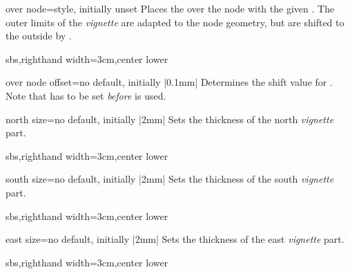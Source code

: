 \begin{vigTcbKey}[][doc new=2016-04-22]{over node}{=}{style, initially unset}
  Places the  over the node with the given .
  The outer limits of the \emph{vignette} are adapted to the node geometry, but
  are shifted to the outside by .
\begin{dispExample*}{sbs,righthand width=3cm,center lower}
\end{dispExample*}
\end{vigTcbKey}

\begin{vigTcbKey}[][doc new=2016-04-22]{over node offset}{=}{no default, initially |0.1mm|}
  Determines the shift value for .
  Note that  has to be set \emph{before}
   is used.
\end{vigTcbKey}


\begin{vigTcbKey}[][doc new=2016-04-22]{north size}{=}{no default, initially |2mm|}
  Sets the thickness of the north \emph{vignette} part.
\begin{dispExample*}{sbs,righthand width=3cm,center lower}
\end{dispExample*}
\end{vigTcbKey}

\begin{vigTcbKey}[][doc new=2016-04-22]{south size}{=}{no default, initially |2mm|}
  Sets the thickness of the south \emph{vignette} part.
\begin{dispExample*}{sbs,righthand width=3cm,center lower}
\end{dispExample*}
\end{vigTcbKey}

\begin{vigTcbKey}[][doc new=2016-04-22]{east size}{=}{no default, initially |2mm|}
  Sets the thickness of the east \emph{vignette} part.
\begin{dispExample*}{sbs,righthand width=3cm,center lower}
\end{dispExample*}
\end{vigTcbKey}

